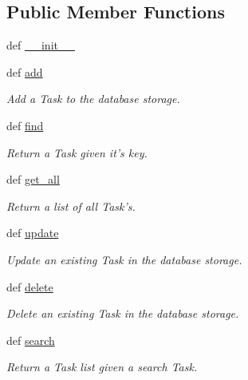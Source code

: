 \subsection*{\-Public \-Member \-Functions}
\begin{DoxyCompactItemize}
\item 
def \hyperlink{classstorage_1_1SQLiteStorage_ac61e8f98fc1319468ec6e30b2ab9e4a7}{\-\_\-\-\_\-init\-\_\-\-\_\-}
\item 
def \hyperlink{classstorage_1_1SQLiteStorage_ae540c3c47f35a52d638f634a0782a7af}{add}
\begin{DoxyCompactList}\small\item\em \-Add a \-Task to the database storage. \end{DoxyCompactList}\item 
def \hyperlink{classstorage_1_1SQLiteStorage_a3ad42c6cfdc3a5740c461fe1a87a963a}{find}
\begin{DoxyCompactList}\small\item\em \-Return a \-Task given it's key. \end{DoxyCompactList}\item 
def \hyperlink{classstorage_1_1SQLiteStorage_a9a64b929488dfb6ceff46039a5f622ab}{get\-\_\-all}
\begin{DoxyCompactList}\small\item\em \-Return a list of all \-Task's. \end{DoxyCompactList}\item 
def \hyperlink{classstorage_1_1SQLiteStorage_a0a9ade02509f896caf7a32d02651857e}{update}
\begin{DoxyCompactList}\small\item\em \-Update an existing \-Task in the database storage. \end{DoxyCompactList}\item 
def \hyperlink{classstorage_1_1SQLiteStorage_a9ad3dc6a2fc126429be96188efda72a6}{delete}
\begin{DoxyCompactList}\small\item\em \-Delete an existing \-Task in the database storage. \end{DoxyCompactList}\item 
def \hyperlink{classstorage_1_1SQLiteStorage_a7e8c17a6ec5b2cbe72befb73bb38357c}{search}
\begin{DoxyCompactList}\small\item\em \-Return a \-Task list given a search \-Task. \end{DoxyCompactList}\end{DoxyCompactItemize}
